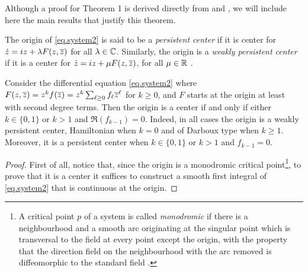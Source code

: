 Although a proof for Theorem 1 is derived directly from \textcite{Gasull2016} and \textcite{Zoladek1994}, we will include here the main results that justify this theorem.

\begin{definicio}
The origin of \eqref{eq.system2} is said to be a \emph{persistent center} if it is center for $\dot z=iz+\lambda F(z,\overline{z})$ for all $\lambda\in\mathbb{C}$. Similarly, the origin is a \emph{weakly persistent center} if it is a center for $\dot z=iz+\mu F(z,\overline{z})$, for all $\mu\in\mathbb{R}$ \parencite{Cima2009}.
\end{definicio}

\begin{theorem}
\label{th.gagito}
Consider the differential equation \eqref{eq.system2} where $F(z,\overline{z})=z^kf(\overline{z})=z^k\sum_{\ell\ge0}f_\ell\overline{z}^\ell$ for $k\ge0$, and $F$ starts at the origin at least with second degree terms. Then the origin is a center if and only if either $k\in\{0,1\}$ or $k>1$ and $\Re(f_{k-1})=0$. Indeed, in all cases the origin is a weakly persistent center, Hamiltonian when $k=0$ and of Darboux type when $k\ge1$. Moreover, it is a persistent center when $k\in\{0,1\}$ or $k>1$ and $f_{k-1}=0$.
\begin{proof}
First of all, notice that, since the origin is a monodromic critical point\footnote{A critical point $p$ of a system is called \emph{monodromic} if there is a neighbourhood and a smooth arc originating at the singular point which is transversal to the field at every point except the origin, with the property that the direction field on the neighbourhood with the arc removed is diffeomorphic to the standard field  \parencite{Aranson1996}.}, to prove that it is a center it suffices to construct a smooth first integral of \eqref{eq.system2} that is continuous at the origin.


\end{proof}
\end{theorem}
